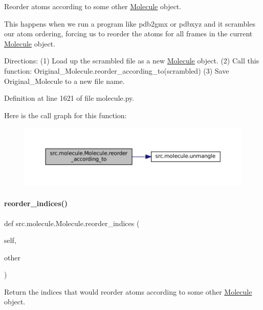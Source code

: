 Reorder atoms according to some other \hyperlink{classsrc_1_1molecule_1_1Molecule}{Molecule} object. 

This happens when we run a program like pdb2gmx or pdbxyz and it scrambles our atom ordering, forcing us to reorder the atoms for all frames in the current \hyperlink{classsrc_1_1molecule_1_1Molecule}{Molecule} object.

Directions\+: (1) Load up the scrambled file as a new \hyperlink{classsrc_1_1molecule_1_1Molecule}{Molecule} object. (2) Call this function\+: Original\+\_\+\+Molecule.\+reorder\+\_\+according\+\_\+to(scrambled) (3) Save Original\+\_\+\+Molecule to a new file name. 

Definition at line 1621 of file molecule.\+py.

Here is the call graph for this function\+:
\nopagebreak
\begin{figure}[H]
\begin{center}
\leavevmode
\includegraphics[width=350pt]{classsrc_1_1molecule_1_1Molecule_a16dcb06bf37392ef659cc156e0b61688_cgraph}
\end{center}
\end{figure}
\mbox{\label{classsrc_1_1molecule_1_1Molecule_a9f764980b8a0df810aa7264036617975}} 
\paragraph{\texorpdfstring{reorder\+\_\+indices()}{reorder\_indices()}}
{\footnotesize\ttfamily def src.\+molecule.\+Molecule.\+reorder\+\_\+indices (\begin{DoxyParamCaption}\item[{}]{self,  }\item[{}]{other }\end{DoxyParamCaption})}



Return the indices that would reorder atoms according to some other \hyperlink{classsrc_1_1molecule_1_1Molecule}{Molecule} object. 

